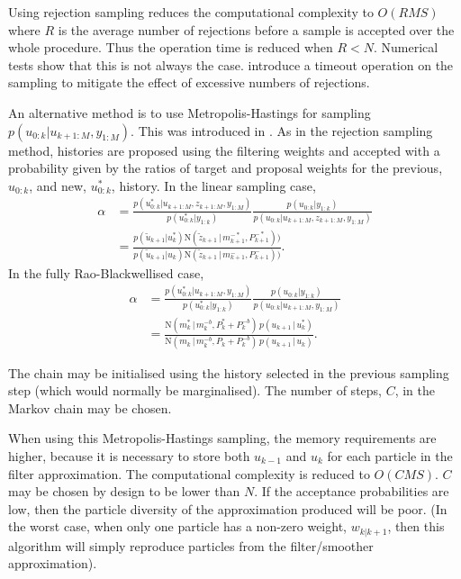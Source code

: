 \documentclass[twocolumn]{autart}    %
\begin{document}
Using rejection sampling reduces the computational complexity to $O(RMS)$ where $R$ is the average number of rejections before a sample is accepted over the whole procedure. Thus the operation time is reduced when $R < N$. Numerical tests show that this is not always the case. \cite{Lindsten+Schon:2011} introduce a timeout operation on the sampling to mitigate the effect of excessive numbers of rejections.

An alternative method is to use Metropolis-Hastings for sampling $p(u_{0:k}|u_{k+1:M}, y_{1:M})$. This was introduced in \cite{Bunch+Godsill:2012}. As in the rejection sampling method, histories are proposed using the filtering weights and accepted with a probability given by the ratios of target and proposal weights for the previous, $u_{0:k}$, and new, $u_{0:k}^*$, history. In the linear sampling case,
%
\begin{equation}
\begin{split}
  \alpha &= \frac{ p(u_{0:k}^*|u_{k+1:M}, z_{k+1:M}, y_{1:M}) }{ p(u_{0:k}^*|y_{1:k}) }\frac{ p(u_{0:k}|y_{1:k}) }{ p(u_{0:k}|u_{k+1:M}, z_{k+1:M}, y_{1:M}) } \\
  &= \frac{ p(\tilde{u}_{k+1} | u_k^{*}) \mathrm{N}(\tilde{z}_{k+1}\,|\, m^{-*}_{k+1}, P^{-*}_{k+1}) ) }{ p(\tilde{u}_{k+1} | u_k) \mathrm{N}(\tilde{z}_{k+1}\,|\, m^{-}_{k+1}, P^{-}_{k+1}) ) }     .
\end{split}
\end{equation}
%
In the fully Rao-Blackwellised case,
%
\begin{equation}
\begin{split}
  \alpha &= \frac{ p(u_{0:k}^*|u_{k+1:M}, y_{1:M}) }{ p(u_{0:k}^*|y_{1:k}) }\frac{ p(u_{0:k}|y_{1:k}) }{ p(u_{0:k}|u_{k+1:M}, y_{1:M}) } \\
  &= \frac{ \mathrm{N}(m_k^{*}\,|\,m^{-b}_{k},P_k^{*}+P^{-b}_{k}) \, p(u_{k+1}\,|\,u_{k}^{*}) }{ \mathrm{N}(m_k\,|\,m^{-b}_{k},P_k+P^{-b}_{k}) \, p(u_{k+1}\,|\,u_{k}) }     .
\end{split}
\end{equation}

The chain may be initialised using the history selected in the previous sampling step (which would normally be marginalised). The number of steps, $C$, in the Markov chain may be chosen.

When using this Metropolis-Hastings sampling, the memory requirements are higher, because it is necessary to store both $u_{k-1}$ and $u_k$ for each particle in the filter approximation. The computational complexity is reduced to $O(CMS)$. $C$ may be chosen by design to be lower than $N$. If the acceptance probabilities are low, then the particle diversity of the approximation produced will be poor. (In the worst case, when only one particle has a non-zero weight, $w_{k|k+1}$, then this algorithm will simply reproduce particles from the filter/smoother approximation).
\end{document}
